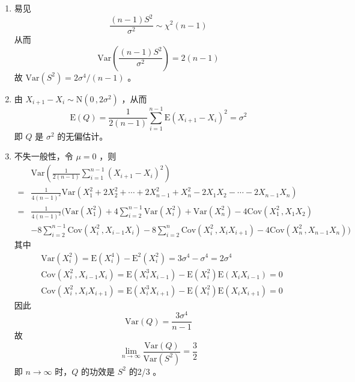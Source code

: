 \documentclass[12pt,hyperref,]{ctexart}
\begin{document}
\begin{enumerate}
\def\labelenumi{(\arabic{enumi})}
\item
  易见 \begin{equation*}
  \frac{(n-1)S^2}{\sigma^2}\sim \chi^2(n-1)
  \end{equation*}从而 \begin{equation*}
  \mathrm{Var}\left(\frac{(n-1)S^2}{\sigma^2}\right)=2(n-1)
  \end{equation*}故 \(\mathrm{Var}(S^2)=2\sigma^4/(n-1)\) 。
\item
  由 \(X_{i+1}-X_{i}\sim\mathrm{N}(0\, ,2\sigma^2)\) ，从而
  \begin{equation*}
  \mathrm{E}(Q)=\frac{1}{2(n-1)}\sum_{i=1}^{n-1}\mathrm{E}(X_{i+1}-X_{i})^2=\sigma^2
  \end{equation*}即 \(Q\) 是 \(\sigma^2\) 的无偏估计。
\item
  不失一般性，令 \(\mu=0\) ，则 \begin{equation*}
  \begin{aligned}
  &\mathrm{Var}\left(\frac{1}{2(n-1)}\sum_{i=1}^{n-1}(X_{i+1}-X_{i})^2\right) \\
  =& \frac{1}{4(n-1)^2}\mathrm{Var}\left(X_1^2+2X_2^2+\cdots+2X_{n-1}^2+X_n^2-2X_1X_2-\cdots-2X_{n-1}X_n\right) \\
  =& \frac{1}{4(n-1)^2}(\mathrm{Var}(X_1^2)+4\sum_{i=2}^{n-1}\mathrm{Var}(X_i^2)+\mathrm{Var}(X_n^2)-4\mathrm{Cov}(X_1^2\, ,X_1X_2) \\
  &-8\sum_{i=2}^{n-1}\mathrm{Cov}(X_i^2\, ,X_{i-1}X_{i})-8\sum_{i=2}^{n}\mathrm{Cov}(X_i^2\, ,X_iX_{i+1})-4\mathrm{Cov}(X_n^2\, ,X_{n-1}X_n)) 
  \end{aligned}
  \end{equation*}其中 \begin{equation*}
  \begin{aligned}
  &\mathrm{Var}(X_i^2)=\mathrm{E}(X_i^4)-\mathrm{E}^2(X_i^2)=3\sigma^4-\sigma^4=2\sigma^4 \\
  &\mathrm{Cov}(X_i^2\, ,X_{i-1}X_{i})=\mathrm{E}(X_i^3X_{i-1})-\mathrm{E}(X_i^2)\mathrm{E}(X_iX_{i-1})=0 \\
  &\mathrm{Cov}(X_i^2\, ,X_{i}X_{i+1})=\mathrm{E}(X_i^3X_{i+1})-\mathrm{E}(X_i^2)\mathrm{E}(X_iX_{i+1})=0
  \end{aligned}
  \end{equation*}因此 \begin{equation*}
  \mathrm{Var}(Q)=\frac{3\sigma^4}{n-1}
  \end{equation*}故 \begin{equation*}
  \lim_{n\to \infty}\frac{\mathrm{Var}(Q)}{\mathrm{Var}(S^2)}=\frac 32
  \end{equation*}即 \(n \to \infty\) 时，\(Q\) 的功效是 \(S^2\) 的2/3 。
\end{enumerate}
\end{document}
